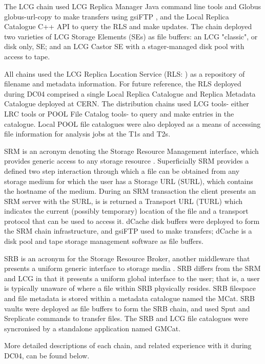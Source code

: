 \documentclass{cmspaper}
\begin{document}
The LCG chain used LCG Replica Manager Java command line tools
\cite{rmapi} and Globus globus-url-copy \cite{globus} to make
transfers using gsiFTP \cite{gsiftp}, and the Local Replica Catalogue
C++ API \cite{rmapi} to query the RLS and make updates. The chain
deployed two varieties of LCG Storage Elements (SEs) as file buffers:
an LCG "classic", or disk only, SE; and an LCG Castor SE with a
stager-managed disk pool with access to tape.

All chains used the LCG Replica Location Service (RLS: \cite{rls}) as
a repository of filename and metadata information. For future
reference, the RLS deployed during DC04 comprised a single Local
Replica Catalogue and Replica Metadata Catalogue deployed at CERN. The
distribution chains used LCG tools- either LRC tools or POOL
\cite{POOL} File Catalog tools- to query and make entries in the
catalogue. Local POOL file catalogues were also deployed as a means of
accessing file information for analysis jobs at the T1s and T2s.

SRM is an acronym denoting the Storage Resource Management interface,
which provides generic access to any storage resource
\cite{srm}. Superficially SRM provides a defined two step interaction
through which a file can be obtained from any storage medium for which
the user has a Storage URL (SURL), which contains the hostname of the
medium. During an SRM transaction the client presents an SRM server
with the SURL, is is returned a Transport URL (TURL) which indicates
the current (possibly temporary) location of the file and a transport
protocol that can be used to access it. dCache disk buffers were
deployed to form the SRM chain infrastructure, and gsiFTP used to make
transfers; dCache \cite{dcache} is a disk pool and tape storage
management software as file buffers.

SRB is an acronym for the Storage Resource Broker, another middleware
that presents a uniform generic interface to storage media
\cite{srb}. SRB differs from the SRM and LCG in that it presents a
uniform global interface to the user; that is, a user is typically
unaware of where a file within SRB physically resides. SRB filespace
and file metadata is stored within a metadata catalogue named the
MCat. SRB vaults were deployed as file buffers to form the SRB chain,
and used Sput and Sreplicate commands to transfer files. The SRB and
LCG file catalogues were syncronised by a standalone application named
GMCat.

More detailed descriptions of each chain, and related experience with
it during DC04, can be found below.
\end{document}

